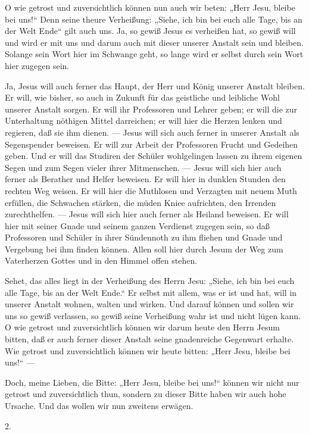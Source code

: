 O wie getrost und zuversichtlich können nun auch wir beten: „Herr Jesu, bleibe bei uns!“ Denn seine theure Verheißung: „Siehe, ich bin bei euch alle Tage, bis an der Welt Ende“ gilt auch uns. Ja, so gewiß Jesus es verheißen hat, so gewiß will und wird er mit uns und darum auch mit dieser unserer Anstalt sein und bleiben. Solange sein Wort hier im Schwange geht, so lange wird er selbst durch sein Wort hier zugegen sein.

Ja, Jesus will auch ferner das Haupt, der Herr und König unserer Anstalt bleiben. Er will, wie bisher, so auch in Zukunft für das geistliche und leibliche Wohl unserer Anstalt sorgen. Er will ihr Professoren und Lehrer geben; er will die zur Unterhaltung nöthigen Mittel darreichen; er will hier die Herzen lenken und regieren, daß sie ihm dienen. — Jesus will sich auch ferner in unserer Anstalt als Segenspender beweisen. Er will zur Arbeit der Professoren Frucht und Gedeihen geben. Und er will das Studiren der Schüler wohlgelingen lassen zu ihrem eigenen
Segen und zum Segen vieler ihrer Mitmenschen. — Jesus will sich hier auch ferner als Berather und Helfer beweisen. Er will hier in dunklen Stunden den rechten Weg weisen. Er will hier die Muthlosen und Verzagten mit neuem Muth erfüllen, die Schwachen stärken, die müden Kniee aufrichten, den Irrenden zurechthelfen. — Jesus will sich hier auch ferner als Heiland beweisen. Er will hier mit seiner Gnade und seinem ganzen Verdienst zugegen sein, so daß Professoren und Schüler in ihrer Sündennoth zu ihm fliehen und Gnade und Vergebung bei ihm finden können. Allen soll hier durch Jesum der Weg zum Vaterherzen Gottes und in den Himmel offen stehen.

Sehet, das alles liegt in der Verheißung des Herrn Jesu: „Siehe, ich bin bei euch alle Tage, bis an der Welt Ende.“ Er selbst mit allem, was er ist und hat, will in unserer Anstalt wohnen, walten und wirken. Und darauf können und sollen wir uns so gewiß verlassen, so gewiß seine Verheißung wahr ist und nicht lügen kann. O wie getrost und zuversichtlich können wir darum heute den Herrn Jesum bitten, daß er auch ferner dieser Anstalt seine gnadenreiche Gegenwart erhalte. Wie getrost und zuversichtlich können wir heute bitten: „Herr Jesu, bleibe bei uns!“ —

Doch, meine Lieben, die Bitte: „Herr Jesu, bleibe bei uns!“ können wir nicht nur getrost und zuversichtlich thun, sondern zu dieser Bitte haben wir auch hohe Ursache. Und das wollen wir nun zweitens erwägen.

2.

